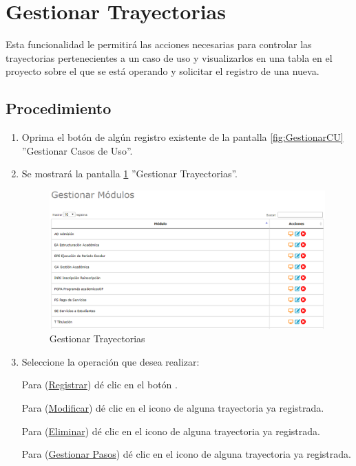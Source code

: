 \hypertarget{cv:GestionarTray}{\section{Gestionar Trayectorias}} \label{sec:GestionarTray}

	Esta funcionalidad le permitirá las acciones necesarias para controlar las trayectorias pertenecientes a un caso de uso y visualizarlos en una tabla en el proyecto sobre el que se está operando y solicitar el registro de una nueva.

		\subsection{Procedimiento}

			\begin{enumerate}
			
			\item Oprima el botón \IUTray{} de algún registro existente de la pantalla \ref{fig:GestionarCU} ''Gestionar Casos de Uso''.
	
			\item Se mostrará la pantalla \ref{fig:GestionarTrayectorias} ''Gestionar Trayectorias''.

			\begin{figure}[htbp!]
				\begin{center}
					\includegraphics[scale=0.6]{roles/lider/casosUso/pantallas/IU5gestionarModulos}
					\caption{Gestionar Trayectorias}
					\label{fig:GestionarTrayectorias}
				\end{center}
			\end{figure}
		
				\item Seleccione la operación que desea realizar:
			
			Para (\hyperlink{cv:registrarTray}{Registrar}) dé clic en el botón \IURegistrar.
			
			Para (\hyperlink{cv:modificarTray}{Modificar}) dé clic en el icono \IUEditar{} de alguna trayectoria ya registrada.
			
			Para (\hyperlink{cv:eliminarTray}{Eliminar}) dé clic en el icono \IUBotonEliminar{} de alguna trayectoria ya registrada.
			
			Para (\hyperlink{cv:GestionarPasos}{Gestionar Pasos}) dé clic en el icono \IUBotonEliminar{} de alguna trayectoria ya registrada.
			
			\end{enumerate}